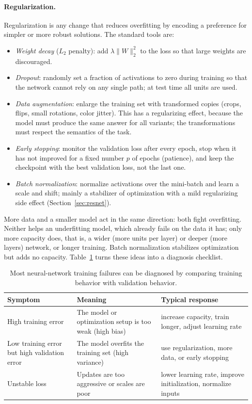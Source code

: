 \paragraph{Regularization.}
Regularization is any change that reduces overfitting by encoding a preference
for simpler or more robust solutions. The standard tools are:
\begin{itemize}
  \item \emph{Weight decay} ($L_2$ penalty): add $\lambda\lVert W\rVert_2^2$ to the
        loss so that large weights are discouraged.
  \item \emph{Dropout}: randomly set a fraction of activations to zero during
        training so that the network cannot rely on any single path; at test
        time all units are used.
  \item \emph{Data augmentation}: enlarge the training set with transformed
        copies (crops, flips, small rotations, color jitter). This has a
        regularizing effect, because the model must produce the same answer for
        all variants; the transformations must respect the semantics of the
        task.
  \item \emph{Early stopping}: monitor the validation loss after every epoch,
        stop when it has not improved for a fixed number $p$ of epochs
        (patience), and keep the checkpoint with the best validation loss, not
        the last one.
  \item \emph{Batch normalization}: normalize activations over the mini-batch and
        learn a scale and shift; mainly a stabilizer of optimization with a mild
        regularizing side effect (Section~\ref{sec:resnet}).
\end{itemize}
\noindent
More data and a smaller model act in the same direction: both fight
overfitting. Neither helps an underfitting model, which already fails on the
data it has; only more capacity does, that is, a wider (more units per layer)
or deeper (more layers) network, or longer training. Batch normalization
stabilizes optimization but adds no capacity. Table~\ref{tab:diagnosis} turns
these ideas into a diagnosis checklist.

\begin{table}[ht]
  \centering
  \begin{tabular}{@{}p{3.0cm}p{5.2cm}p{5.0cm}@{}}
    \toprule
    Symptom & Meaning & Typical response \\
    \midrule
    High training error & The model or optimization setup is too weak (high
      bias) & increase capacity, train longer, adjust learning rate \\
    Low training error but high validation error & The model overfits the
      training set (high variance) & use regularization, more data, or early
      stopping \\
    Unstable loss & Updates are too aggressive or scales are poor &
      lower learning rate, improve initialization, normalize inputs \\
    \bottomrule
  \end{tabular}
  \caption{Most neural-network training failures can be diagnosed by comparing
  training behavior with validation behavior.}
  \label{tab:diagnosis}
\end{table}
